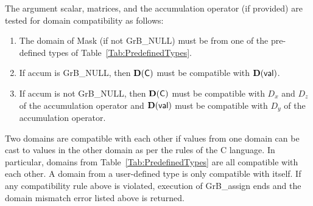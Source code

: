 The argument scalar, matrices, and the accumulation 
operator (if provided) are tested for domain compatibility as follows:
\begin{enumerate}
	\item The domain of {\sf Mask} (if not {\sf GrB\_NULL}) must be from one of 
    the pre-defined types of Table~\ref{Tab:PredefinedTypes}.

	\item If {\sf accum} is {\sf GrB\_NULL}, then $\bold{D}({\sf C})$ must be 
    compatible with $\bold{D}({\sf val})$.

	\item If {\sf accum} is not {\sf GrB\_NULL}, then $\bold{D}({\sf C})$ must be
    compatible with $D_x$ and $D_z$ of the accumulation operator and 
    $\bold{D}({\sf val})$ must be compatible with $D_y$ of the accumulation operator.
\end{enumerate}
Two domains are compatible with each other if values from one domain can be cast 
to values in the other domain as per the rules of the C language.
In particular, domains from Table~\ref{Tab:PredefinedTypes} are all compatible 
with each other. A domain from a user-defined type is only compatible with itself.
If any compatibility rule above is violated, execution of {\sf GrB\_assign} ends
and the domain mismatch error listed above is returned.

